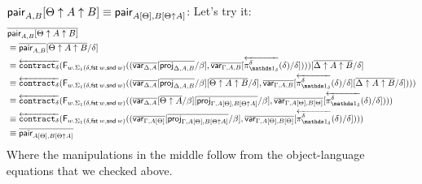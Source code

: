 \documentclass[10pt]{article}
\theoremstyle{definition}
\newcommand\dsd[1]{\ensuremath{\mathsf{#1}}}
\newcommand{\app}[2]{\ensuremath{#1 \: #2}}
\newcommand{\fst}[1]{\app{\dsd{fst}}{#1}}
\newcommand{\snd}[1]{\app{\dsd{snd}}{#1}}
\newcommand{\rewrite}[2]{\overleftarrow{#1}(#2)}
\newcommand\FIs[2]{\ensuremath{\mathsf{F}_{#1}{(#2)}}}
\begin{document}
\begin{enumerate}[style = multiline, labelwidth = 80pt]
\item[{$\mathsf{pair}_{A, B}[\Theta \uparrow A \uparrow B] \equiv \mathsf{pair}_{A[\Theta], B[\Theta \uparrow A]}$}:]
Let's try it:
\begin{align*}
&\upstairs{\qpair{A, B}[\Theta \uparrow A \uparrow B]} \\
&\equiv \upstairs{\qpair{A, B}}[\upstairs{\Theta \uparrow A \uparrow B}/\delta] \\
&\equiv \rewrite{\contract{\delta}}{\FIs{w. \Sigma_1(\delta,\fst w, \snd w)}{(\upstairs{\qvar{\Delta, A}}[\upstairs{\proj{\Delta, A, B}}/\beta], \upstairs{\qvar{\Gamma, A, B}}[\rewrite{\pi^\delta_{\One_\delta}}{\delta}/\delta])}}[\upstairs{\Delta \uparrow A \uparrow B}/\delta] \\
&\equiv \rewrite{\contract{\delta}}{\FIs{w. \Sigma_1(\delta,\fst w, \snd w)}{(\upstairs{\qvar{\Delta, A}}[\upstairs{\proj{\Delta, A, B}}/\beta][\upstairs{\Theta \uparrow A \uparrow B}/\delta], \upstairs{\qvar{\Gamma, A, B}}[\rewrite{\pi^\delta_{\One_\delta}}{\delta}/\delta][\upstairs{\Delta \uparrow A \uparrow B}/\delta])}} \\
&\equiv \rewrite{\contract{\delta}}{\FIs{w. \Sigma_1(\delta,\fst w, \snd w)}{(\upstairs{\qvar{\Delta, A}}[\upstairs{\Theta \uparrow A}/\beta][\upstairs{\proj{\Gamma, A[\Theta], B[\Theta \uparrow A]}}/\beta], \upstairs{\qvar{\Gamma, A[\Theta], B[\Theta]}}[\rewrite{\pi^\delta_{\One_\delta}}{\delta}/\delta])}} \\
&\equiv \rewrite{\contract{\delta}}{\FIs{w. \Sigma_1(\delta,\fst w, \snd w)}{(\upstairs{\qvar{\Gamma, A[\Theta]}}[\upstairs{\proj{\Gamma, A[\Theta], B[\Theta \uparrow A]}}/\beta], \upstairs{\qvar{\Gamma, A[\Theta], B[\Theta]}}[\rewrite{\pi^\delta_{\One_\delta}}{\delta}/\delta])}} \\
&\equiv \upstairs{\qpair{A[\Theta], B[\Theta \uparrow A]}}
\end{align*}
Where the manipulations in the middle follow from the object-language equations that we checked above.


\end{enumerate}
\end{document}
